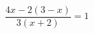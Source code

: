 \begin{ex}[type=equation]
	\begin{condition}
		$\dfrac{4x -2(3-x)}{3(x+2)} = 1$
	\end{condition}
\end{ex}